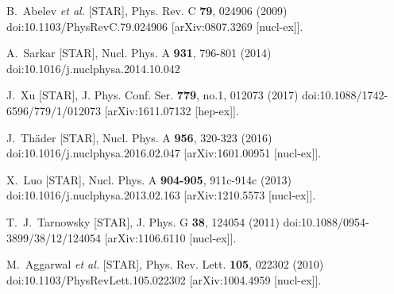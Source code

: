 
\begin{thebibliography}{99}


B.~Abelev \textit{et al.} [STAR],
Phys. Rev. C \textbf{79}, 024906 (2009)
doi:10.1103/PhysRevC.79.024906
[arXiv:0807.3269 [nucl-ex]].

A.~Sarkar [STAR],
Nucl. Phys. A \textbf{931}, 796-801 (2014)
doi:10.1016/j.nuclphysa.2014.10.042

J.~Xu [STAR],
J. Phys. Conf. Ser. \textbf{779}, no.1, 012073 (2017)
doi:10.1088/1742-6596/779/1/012073
[arXiv:1611.07132 [hep-ex]].

J.~Thäder [STAR],
Nucl. Phys. A \textbf{956}, 320-323 (2016)
doi:10.1016/j.nuclphysa.2016.02.047
[arXiv:1601.00951 [nucl-ex]].

X.~Luo [STAR],
Nucl. Phys. A \textbf{904-905}, 911c-914c (2013)
doi:10.1016/j.nuclphysa.2013.02.163
[arXiv:1210.5573 [nucl-ex]].

T.~J.~Tarnowsky [STAR],
J. Phys. G \textbf{38}, 124054 (2011)
doi:10.1088/0954-3899/38/12/124054
[arXiv:1106.6110 [nucl-ex]].

M.~Aggarwal \textit{et al.} [STAR],
Phys. Rev. Lett. \textbf{105}, 022302 (2010)
doi:10.1103/PhysRevLett.105.022302
[arXiv:1004.4959 [nucl-ex]].


\end{thebibliography}
